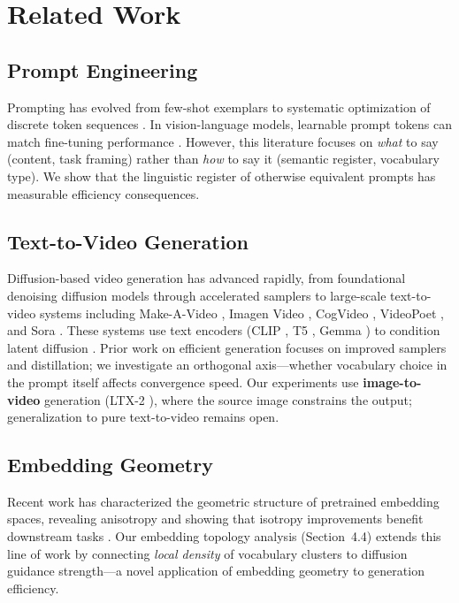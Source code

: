 \documentclass[10pt,twocolumn,letterpaper]{article}
\begin{document}
\section{Related Work}

\subsection{Prompt Engineering}
Prompting has evolved from few-shot exemplars \cite{reynolds2021prompt} to systematic optimization of discrete token sequences \cite{shin2020autoprompt,liu2023prompt}. In vision-language models, learnable prompt tokens can match fine-tuning performance \cite{zhou2022coop}. However, this literature focuses on \textit{what} to say (content, task framing) rather than \textit{how} to say it (semantic register, vocabulary type). We show that the linguistic register of otherwise equivalent prompts has measurable efficiency consequences.

\subsection{Text-to-Video Generation}
Diffusion-based video generation has advanced rapidly, from foundational denoising diffusion models \cite{ho2020ddpm} through accelerated samplers \cite{song2021ddim,karras2022edm,lu2022dpm} to large-scale text-to-video systems including Make-A-Video \cite{singer2022makeavideo}, Imagen Video \cite{ho2022imagenvideo}, CogVideo \cite{hong2023cogvideo}, VideoPoet \cite{kondratyuk2024videopoet}, and Sora \cite{brooks2024}. These systems use text encoders (CLIP \cite{radford2021}, T5 \cite{raffel2020}, Gemma \cite{team2024gemma}) to condition latent diffusion \cite{rombach2022}. Prior work on efficient generation focuses on improved samplers and distillation; we investigate an orthogonal axis---whether vocabulary choice in the prompt itself affects convergence speed. Our experiments use \textbf{image-to-video} generation (LTX-2 \cite{hacohen2024ltx}), where the source image constrains the output; generalization to pure text-to-video remains open.

\subsection{Embedding Geometry}
Recent work has characterized the geometric structure of pretrained embedding spaces, revealing anisotropy \cite{ethayarajh2019geometry} and showing that isotropy improvements benefit downstream tasks \cite{rajaee2021isotropy}. Our embedding topology analysis (Section~4.4) extends this line of work by connecting \textit{local density} of vocabulary clusters to diffusion guidance strength---a novel application of embedding geometry to generation efficiency.
\end{document}
